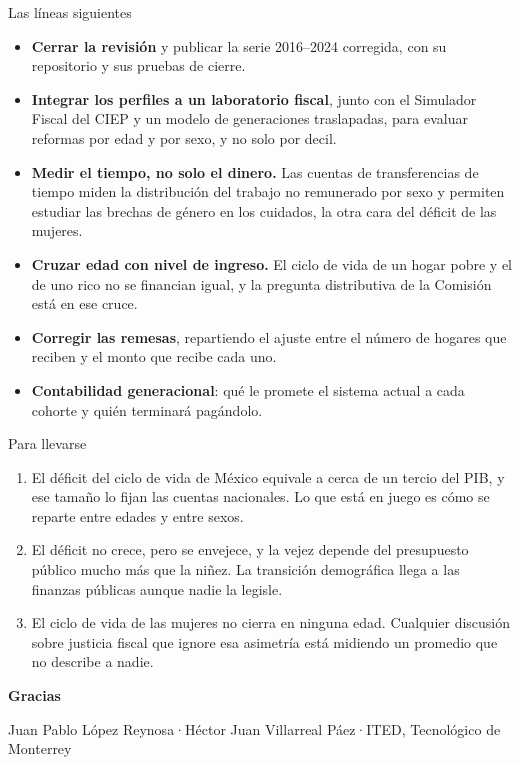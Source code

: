 \documentclass[aspectratio=169,10pt]{beamer}
\newcommand{\clave}[1]{{\color{marino}\bfseries #1}}
\begin{document}
\begin{frame}{Las líneas siguientes}
  \vspace{0.2em}
  \begin{itemize}\setlength{\itemsep}{0.45em}
    \item \clave{Cerrar la revisión} y publicar la serie 2016--2024 corregida, con su repositorio y sus pruebas de cierre.
    \item \clave{Integrar los perfiles a un laboratorio fiscal}, junto con el Simulador Fiscal del CIEP y un modelo de generaciones traslapadas, para evaluar reformas por edad y por sexo, y no solo por decil.
    \item \clave{Medir el tiempo, no solo el dinero.} Las cuentas de transferencias de tiempo miden la distribución del trabajo no remunerado por sexo y permiten estudiar las brechas de género en los cuidados, la otra cara del déficit de las mujeres.
    \item \clave{Cruzar edad con nivel de ingreso.} El ciclo de vida de un hogar pobre y el de uno rico no se financian igual, y la pregunta distributiva de la Comisión está en ese cruce.
    \item \clave{Corregir las remesas}, repartiendo el ajuste entre el número de hogares que reciben y el monto que recibe cada uno.
    \item \clave{Contabilidad generacional}: qué le promete el sistema actual a cada cohorte y quién terminará pagándolo.
  \end{itemize}
\end{frame}

\begin{frame}{Para llevarse}
  \vspace{0.8em}
  \begin{enumerate}\setlength{\itemsep}{0.9em}
    \item El déficit del ciclo de vida de México equivale a cerca de un tercio del PIB, y ese tamaño lo fijan las cuentas nacionales. Lo que está en juego es cómo se reparte entre edades y entre sexos.
    \item El déficit no crece, pero se envejece, y la vejez depende del presupuesto público mucho más que la niñez. La transición demográfica llega a las finanzas públicas aunque nadie la legisle.
    \item El ciclo de vida de las mujeres no cierra en ninguna edad. Cualquier discusión sobre justicia fiscal que ignore esa asimetría está midiendo un promedio que no describe a nadie.
  \end{enumerate}
  \vspace{1.6em}
  \begin{center}
    {\color{marino}\bfseries\large Gracias\par}
    \vspace{0.4em}
    {\scriptsize Juan Pablo López Reynosa\enspace·\enspace Héctor Juan Villarreal Páez\enspace·\enspace ITED, Tecnológico de Monterrey\par}
  \end{center}
\end{frame}
\end{document}
